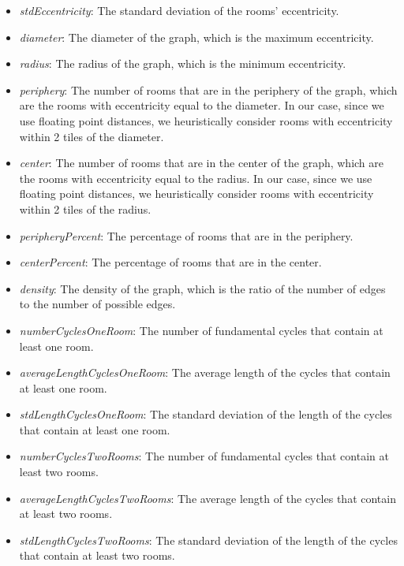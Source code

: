 \begin{itemize}
    \item \textit{stdEccentricity}: The standard deviation of the rooms' eccentricity.
    \item \textit{diameter}: The diameter of the graph, which is the maximum eccentricity.
    \item \textit{radius}: The radius of the graph, which is the minimum eccentricity.
    \item \textit{periphery}: The number of rooms that are in the periphery of the graph, which are the rooms with eccentricity equal to the diameter. In our case, since we use floating point distances, we heuristically consider rooms with eccentricity within 2 tiles of the diameter.
    \item \textit{center}: The number of rooms that are in the center of the graph, which are the rooms with eccentricity equal to the radius. In our case, since we use floating point distances, we heuristically consider rooms with eccentricity within 2 tiles of the radius.
    \item \textit{peripheryPercent}: The percentage of rooms that are in the periphery.
    \item \textit{centerPercent}: The percentage of rooms that are in the center.
    \item \textit{density}: The density of the graph, which is the ratio of the number of edges to the number of possible edges.
    \item \textit{numberCyclesOneRoom}: The number of fundamental cycles that contain at least one room.
    \item \textit{averageLengthCyclesOneRoom}: The average length of the cycles that contain at least one room.
    \item \textit{stdLengthCyclesOneRoom}: The standard deviation of the length of the cycles that contain at least one room.
    \item \textit{numberCyclesTwoRooms}: The number of fundamental cycles that contain at least two rooms.
    \item \textit{averageLengthCyclesTwoRooms}:  The average length of the cycles that contain at least two rooms.
    \item \textit{stdLengthCyclesTwoRooms}: The standard deviation of the length of the cycles that contain at least two rooms.
\end{itemize}

